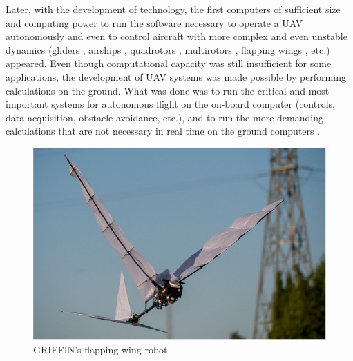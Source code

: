 Later, with the development of technology, the first computers of sufficient size and computing power to run the software necessary to operate a \gls{UAV} autonomously and even to control aircraft with more complex and even unstable dynamics (gliders \cite{predator, BIGBLUE}, airships \cite{AURORA}, quadrotors \cite{quadrotorsreview, mesicopter, pounds, miniquadrotor}, multirotors \cite{fullyactuated}, flapping wings \cite{COLIBRI, GRIFFING, GRIFFIN2021}, etc.) appeared. Even though computational capacity was still insufficient for some applications, the development of \gls{UAV} systems was made possible by performing calculations on the ground. What was done was to run the critical and most important systems for autonomous flight on the on-board computer (controls, data acquisition, obstacle avoidance, etc.), and to run the more demanding calculations that are not necessary in real time on the ground computers \cite{OffBoard}.

\begin{figure}[htbp]
    \centering
    \includegraphics[width=0.6\linewidth]
    {Preliminaries/figures/GRIFFIN.png}
    \caption{GRIFFIN's flapping wing robot \cite{GRIFFIN2021}}
    \label{fig:predator}
\end{figure}

